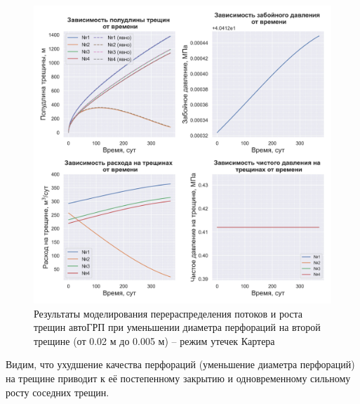 \begin{figure}[H] 
\center
\includegraphics[width=\linewidth]{images/myimage7.jpg}
\caption{Результаты моделирования перераспределения потоков и роста трещин автоГРП при уменьшении диаметра перфораций на второй трещине (от 0.02 м до 0.005 м) -- режим утечек Картера}
\label{fig:myimage7}
\end{figure}

Видим, что ухудшение качества перфораций (уменьшение диаметра перфораций) на трещине приводит к её постепенному закрытию и одновременному сильному росту соседних трещин.

